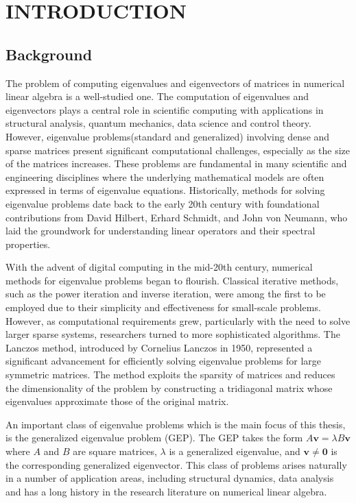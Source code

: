 \chapter{INTRODUCTION}
\newtheorem{theorem}{Theorem}[section]
\newtheorem{definition}{Definition}[section]

\section{Background}\label{sec:Background}

The problem of computing eigenvalues and eigenvectors of matrices in numerical linear algebra is a well-studied one. The computation of eigenvalues and eigenvectors plays a central role in scientific computing with applications in structural analysis, quantum mechanics, data science and control theory. However, eigenvalue problems\added[comment={add space}]{ }(standard and generalized)  involving dense and sparse matrices present significant computational challenges, especially as the size of the matrices increases. These problems are fundamental in many scientific and engineering disciplines where the underlying mathematical models are often expressed in terms of eigenvalue equations. Historically, methods for solving eigenvalue problems date back to the early 20th century with foundational contributions from David Hilbert, Erhard Schmidt, and John von Neumann, who laid the groundwork for understanding linear operators and their spectral properties.

With the advent of digital computing in the mid-20th century, numerical methods for eigenvalue problems began to flourish. Classical iterative methods, such as the power iteration and inverse iteration, were among the first to be employed due to their simplicity and effectiveness for small-scale problems. However, as computational requirements grew, particularly with the need to solve larger sparse systems, researchers turned to more sophisticated algorithms. The Lanczos method, introduced by Cornelius Lanczos in 1950,
represented a significant advancement for efficiently solving eigenvalue problems for large symmetric matrices. The method exploits the sparsity of matrices and reduces the dimensionality of the problem by constructing a tridiagonal matrix whose eigenvalues approximate those of the original matrix.

An important class of eigenvalue problems\added[comment={add comma}]{,} which is the main focus of this thesis, is the generalized eigenvalue problem {} (GEP). The GEP takes the form $A\mathbf{v} = \lambda B\mathbf{v}$ where $A$ and $B$ are square matrices, $\lambda$ is a generalized eigenvalue, and $\mathbf{v}\neq\mathbf{0}$ is the corresponding generalized eigenvector. This class of problems arises naturally in a number of application areas, including structural dynamics, data analysis and has a long history in the research literature on numerical linear algebra.

